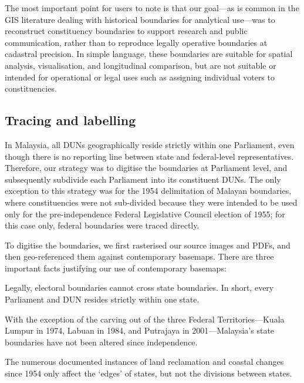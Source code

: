 \documentclass[11pt]{article}
\begin{document}
The most important point for users to note is that our goal---as is common in the GIS literature dealing with historical boundaries for analytical use\cite{knowles2002past, long1995atlas}---was to reconstruct constituency boundaries to support research and public communication, rather than to reproduce legally operative boundaries at cadastral precision. In simple language, these boundaries are suitable for  spatial analysis, visualisation, and longitudinal comparison, but are not suitable or intended for operational or legal uses such as assigning individual voters to constituencies.

\subsection*{Tracing and labelling}

In Malaysia, all DUNs geographically reside strictly within one Parliament, even though there is no reporting line between state and federal-level representatives. Therefore, our strategy was to digitise the boundaries at Parliament level, and subsequently subdivide each Parliament into its constituent DUNs. The only exception to this strategy was for the 1954 delimitation of Malayan boundaries, where constituencies were not sub-divided because they were intended to be used only for the pre-independence Federal Legislative Council election of 1955; for this case only, federal boundaries were traced directly.

To digitise the boundaries, we first rasterised our source images and PDFs, and then geo-referenced them against contemporary basemaps. There are three important facts justifying our use of contemporary basemaps:
\begin{enumar}
	\item Legally, electoral boundaries cannot cross state boundaries. In short, every Parliament and DUN resides strictly within one state.
	\item With the exception of the carving out of the three Federal Territories---Kuala Lumpur in 1974, Labuan in 1984, and Putrajaya in 2001---Malaysia's state boundaries have not been altered since independence.
	\item The numerous documented instances of land reclamation and coastal changes since 1954 only affect the `edges' of states, but not the divisions between states.
\end{enumar}
\end{document}
